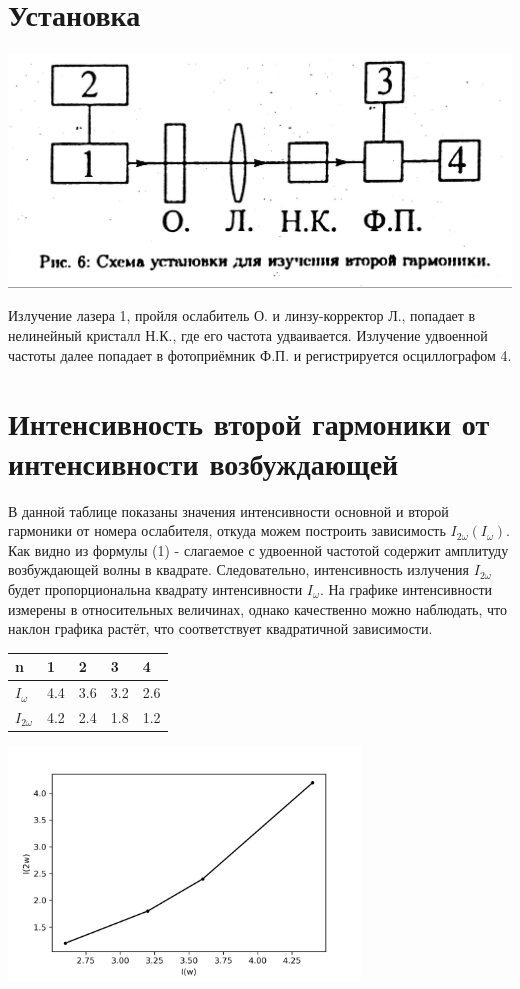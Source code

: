 \documentclass[a4paper,10pt]{extarticle} %
\begin{document}
\section{Установка}
\begin{center}
\includegraphics[width = 0.5 \textwidth]{images/setup.jpg}
\end{center}
Излучение лазера 1, пройля ослабитель О. и линзу-корректор Л., попадает в нелинейный кристалл Н.К., где его частота удваивается. Излучение удвоенной частоты далее попадает в фотоприёмник Ф.П. и регистрируется осциллографом 4.

\section{Интенсивность второй гармоники от интенсивности возбуждающей}
В данной таблице показаны значения интенсивности основной и второй гармоники от номера ослабителя, откуда можем построить зависимость $I_{2 \omega} (I_{\omega})$.\\
Как видно из формулы (1) - слагаемое с удвоенной частотой содержит амплитуду возбуждающей волны в квадрате. Следовательно, интенсивность излучения $I_{2 \omega}$ будет пропорциональна квадрату интенсивности $I_{\omega}$.
На графике интенсивности измерены в относительных величинах, однако качественно можно наблюдать, что наклон графика растёт, что соответствует квадратичной зависимости.

\begin{table}[H]
\begin{tabular}{|l|l|l|l|l|}
\hline
n     & 1   & 2   & 3   & 4   \\ \hline
$I_{\omega}$  & 4.4 & 3.6 & 3.2 & 2.6 \\ \hline
$I_{2 \omega}$ & 4.2 & 2.4 & 1.8 & 1.2 \\ \hline
\end{tabular}
\end{table}

\begin{center}
\includegraphics[width = 0.7\textwidth]{images/plot_1}
\end{center}
\end{document}
